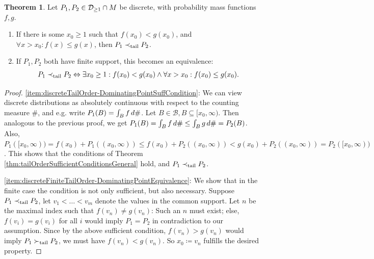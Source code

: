 \documentclass[a4paper]{scrreprt}
\newcommand{\B}{\mathcal{B}}
\newcommand{\M}{M}
\theoremstyle{definition}
\newtheorem{thm}{Theorem}[chapter] %
\begin{document}
    \begin{thm}
        Let $P_1, P_2 \in \Dgeqone \cap \M$ be discrete, with probability mass functions $f, g$.
        \begin{enumerate}
            \item 
            If there is some $x_0 \geq 1$ such that $f(x_0) < g(x_0)$, and $\forall x > x_0: f(x) \leq g(x)$, then $P_1 \prec_{\text{tail}} P_2$.
            \label{item:discreteTailOrder-DominatingPointSuffCondition}
            
            \item 
            If $P_1, P_2$ both have finite support, this becomes an equivalence:
            \begin{gather}
                P_1 \prec_{\text{tail}} P_2 \Leftrightarrow \exists x_0 \geq 1: f(x_0) < g(x_0) \wedge \forall x > x_0: f(x_0) \leq g(x_0).
                \label{eq:discreteFiniteTailOrder-DominatingPointEquivalence}
            \end{gather}            
            \label{item:discreteFiniteTailOrder-DominatingPointEquivalence}
        \end{enumerate}        
    \label{thm:discreteTailOrderSuffConditions}
    \end{thm}
    \vspace{-1.2cm}
    \begin{proof}
        \ref{item:discreteTailOrder-DominatingPointSuffCondition}:
        We can view discrete distributions as absolutely continuous with respect to the counting measure $\#$, and e.g. write $P_1(B) = \int_{B} f \, d\#$.
        Let $B \in \B, B \subseteq [x_0, \infty)$. Then analogous to the previous proof, we get
        $P_1(B) = \int_{B} f \, d\# \leq \int_{B} g \, d\# = P_2(B)$.
        Also, $P_1([x_0, \infty)) = f(x_0) + P_1((x_0, \infty)) \leq f(x_0) + P_2((x_0, \infty)) < g(x_0) + P_2((x_0, \infty)) = P_2([x_0, \infty))$.
        This shows that the conditions of Theorem \ref{thm:tailOrderSufficientConditionsGeneral} hold, and $P_1 \prec_{\text{tail}} P_2$.
        
        \ref{item:discreteFiniteTailOrder-DominatingPointEquivalence}:
        We show that in the finite case the condition is not only sufficient, but also necessary.
        Suppose $P_1 \prec_{\text{tail}} P_2$, let $v_1 < \dots < v_m$ denote the values in the common support.
        Let $n$ be the maximal index such that $f(v_n) \neq g(v_n)$: Such an $n$ must exist; else, $f(v_i) = g(v_i)$ for all $i$ would imply $P_1 = P_2$ in contradiction to our assumption.
        Since by the above sufficient condition, $f(v_n) > g(v_n)$ would imply $P_1 \succ_{\text{tail}} P_2$, we must have $f(v_n) < g(v_n)$. So $x_0 \coloneqq v_n$ fulfills the desired property.
    \end{proof}
\end{document}
